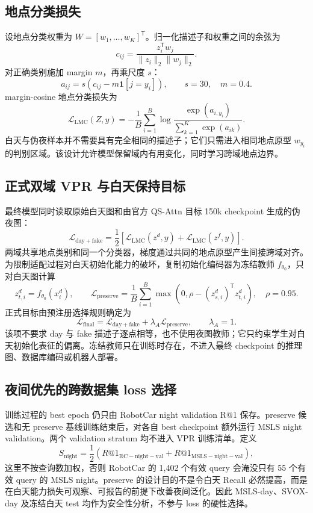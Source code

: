 \documentclass[UTF8,a4paper,11pt]{ctexart}
\begin{document}
\subsection{地点分类损失}
设地点分类权重为 $W=[w_1,\ldots,w_K]^{\mathsf T}$。归一化描述子和权重之间的余弦为
\[
 c_{ij}=\frac{z_i^{\mathsf T}w_j}{\lVert z_i\rVert_2\lVert w_j\rVert_2}.
\]
对正确类别施加 margin $m$，再乘尺度 $s$：
\[
 a_{ij}=s\left(c_{ij}-m\mathbf 1[j=y_i]\right),
 \qquad s=30,\quad m=0.4.
\]
margin-cosine 地点分类损失为
\[
 \mathcal L_{\mathrm{LMC}}(Z,y)=-\frac1B\sum_{i=1}^B
 \log\frac{\exp(a_{i,y_i})}{\sum_{k=1}^K\exp(a_{ik})}.
\]
白天与伪夜样本并不需要具有完全相同的描述子；它们只需进入相同地点原型 $w_{y_i}$ 的判别区域。该设计允许模型保留域内有用变化，同时学习跨域地点边界。

\subsection{正式双域 VPR 与白天保持目标}
最终模型同时读取原始白天图和由官方 QS-Attn 目标 150k checkpoint 生成的伪夜图：
\[
 \mathcal L_{\mathrm{day+fake}}=
 \frac12\left[\mathcal L_{\mathrm{LMC}}(z^d,y)+
 \mathcal L_{\mathrm{LMC}}(z^f,y)\right].
\]
两域共享地点类别和同一个分类器，梯度通过共同的地点原型产生间接跨域对齐。为限制适配过程对白天初始化能力的破坏，复制初始化编码器为冻结教师 $f_{\theta_0}$，只对白天图计算
\[
 z_{t,i}^d=f_{\theta_0}(x_i^d),\qquad
 \mathcal L_{\mathrm{preserve}}=
 \frac1B\sum_{i=1}^{B}\max\left(0,\rho-(z_{s,i}^d)^{\mathsf T}z_{t,i}^d\right),
 \quad \rho=0.95.
\]
正式目标由预注册选择规则确定为
\[
 \boxed{\mathcal L_{\mathrm{final}}=
 \mathcal L_{\mathrm{day+fake}}+\lambda_A\mathcal L_{\mathrm{preserve}},
 \qquad \lambda_A=1.}
\]
该项不要求 day 与 fake 描述子逐点相等，也不使用夜图教师；它只约束学生对白天初始化表征的偏离。冻结教师只在训练时存在，不进入最终 checkpoint 的推理图、数据库编码或机器人部署。

\subsection{夜间优先的跨数据集 loss 选择}
训练过程的 best epoch 仍只由 RobotCar night validation R@1 保存。preserve 候选和无 preserve 基线训练结束后，对各自 best checkpoint 额外运行 MSLS night validation。两个 validation stratum 均不进入 VPR 训练清单。定义
\[
 S_{\mathrm{night}}=\frac12\left(
 R@1_{\mathrm{RC-night-val}}+R@1_{\mathrm{MSLS-night-val}}
 \right),
\]
这里不按查询数加权，否则 RobotCar 的 1,402 个有效 query 会淹没只有 55 个有效 query 的 MSLS night。preserve 的设计目的不是令白天 Recall 必然提高，而是在白天能力损失可观察、可报告的前提下改善夜间泛化。因此 MSLS-day、SVOX-day 及冻结白天 test 均作为安全性分析，不参与 loss 的硬性选择。
\end{document}

